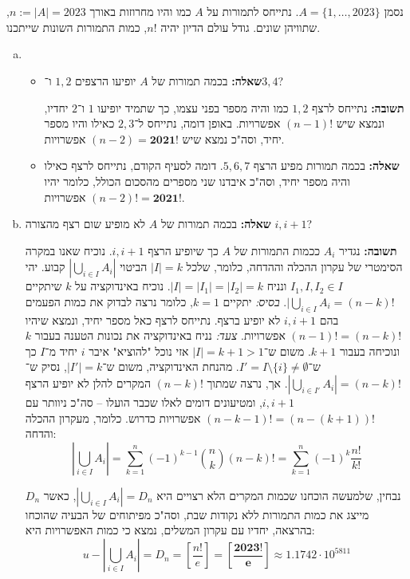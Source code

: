 \documentclass[]{article}
\newcommand\sumnko    {\sum_{k = 1}^{n}}
\newcommand\bink      {\binom{n}{k}}
\newcommand\cupiiai   {\bigcup_{i \in I} A_i}
\newcommand\sof[1]    {\left | #1 \right |}
\begin{document}
	\section{} %
	נסמן $A = \{1, \dots, 2023\}$. נתייחס לתמורות על $A$ כמו והיו מחרוזות באורך $n:= |A| = 2023 $, שתוויהן שונים. גודל עולם הדיון יהיה $n!$, כמות התמורות השונות שייתכנו. 
	\begin{enumerate}[(a)]
		\item \begin{itemize}
			\item \textbf{שאלה: }בכמה תמורות של $A$ יופיעו הרצפים $ 1, 2 $ ו־$ 3, 4 $?
			
			\textbf{תשובה: }נתייחס לרצף $1, 2 $ כמו והיה מספר בפני עצמו, כך שתמיד יופיעו $1$ ו־$2$ יחדיו, ונמצא שיש $(n - 1)!$ אפשרויות. באופן דומה, נתייחס ל־$2, 3 $ כאילו והיו מספר יחיד, וסה"כ נמצא שיש $(n - 2) = \bm{2021!}$ אפשרויות. 
			
			\item \textbf{שאלה: }בכמה תמורות מפיע הרצף $5, 6, 7$. דומה לסעיף הקודם, נתייחס לרצף כאילו והיה מספר יחיד, וסה"כ איבדנו שני מספרים מהסכום הכולל, כלומר יהיו $(n - 2)! = \bm{2021!}$ אפשרויות. 
		\end{itemize}
		\item \textbf{שאלה: }בכמה תמורות של $A$ לא מופיע שום רצף מהצורה $i, i + 1$?
		
		\textbf{תשובה: }נגדיר $A_i$ ככמות התמורות של $A$ כך שיופיע הרצף $i, i + 1$. נוכיח שאנו במקרה הסימטרי של עקרון ההכלה וההדחה, כלומר, שלכל $|I| = k$ הביטוי $|\cupiiai|$ קבוע. יהי $I_1, I, I_2 \in I$ ונניח $|I| = |I_1| = |I_2| = k$. נוכיח באינדוקציה על $k$ שיתקיים $|\cupiiai = (n - k)!$. \textit{בסיס: }יתקיים $k = 1$, כלומר נרצה לבדוק את כמות הפעמים בהם $i, i + 1$ לא יופיע ברצף. נתייחס לרצף כאל מספר יחיד, ונמצא שיהיו $(n - 1)! = (n - k)!$ אפשרויות. \textit{צעד: }נניח באינדוקציה את נכונות הטענה בעבור $k$ ונוכיחה בעבור $k + 1$. משום ש־$|I| = k + 1 > 1$ אזי נוכל "להוציא" איבר $i$ יחיד מ־$I$ כך ש־$I' = I \setminus \{i\} \neq \emptyset$. מהנחת האינדוקציה, משום ש־$|I'| = k $, נסיק ש־$|\bigcup_{i \in I'}A_i| = (n - k)!$. אך, נרצה שמתוך $(n - k)!$ המקרים להלן לא יופיע הרצף $i, i + 1$, ומטיעונים דומים לאלו שכבר הועלו – סה"כ ניוותר עם $(n - k - 1)! = (n - (k + 1))!$ אפשרויות כדרוש. כלומר, מעקרון ההכלה והדחה: 
		\[ \sof{\cupiiai} = \sumnko (-1)^{k - 1} \bink(n - k)! = \sumnko (-1)^k \frac{n!}{k!} \]
		
		נבחין, שלמעשה הוכחנו שכמות המקרים הלא רצויים היא $|\cupiiai| = D_n$, כאשר $D_n$ מייצג את כמות התמורות ללא נקודות שבת, וסה"כ מפיתוחים של הבעיה שהוכחו בהרצאה, יחדיו עם עקרון המשלים, נמצא כי כמות האפשרויות היא: 
		\[ u - \sof{\cupiiai} = D_n = \left [\frac{n!}{e}\right ] = \bm{\left[ \frac{2023!}{e} \right]} \approx 1.1742 \cdot 10^{5811} \]
	\end{enumerate}
	
\end{document}
